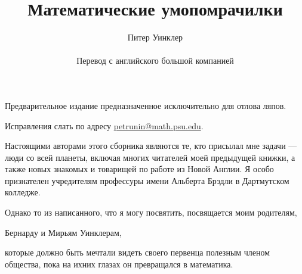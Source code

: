 \documentclass[twoside]{book}
\def\thetitle{Математические умопомрачилки} %
\def\theauthor{Питер Уинклер}
\begin{document}

\title{\thetitle}
\author{\theauthor\\
\\
Перевод с английского большой компанией}
\date{}
\maketitle

\thispagestyle{empty}

Предварительное издание предназначенное исключительно для отлова ляпов. 

Исправления слать по адресу 
\url{petrunin@math.psu.edu}.

\vfill

\pagebreak

Настоящими авторами этого сборника являются те, кто присылал мне задачи --- люди со всей планеты, включая многих читателей моей предыдущей книжки, а также новых знакомых и товарищей по работе из Новой Англии.
Я особо признателен учредителям профессуры имени Альберта Брэдли в Дартмутском колледже.

Однако то из написанного, что я могу посвятить, посвящается моим родителям,
\begin{center}
Бернарду и Мирьям Уинклерам,
\end{center}
которые должно быть мечтали видеть своего первенца полезным членом общества, пока на ихних глазах он превращался в математика.

\thispagestyle{empty}






















\appendix


{
\small

\printindex

}

{

\sloppy

\printbibliography[heading=bibintoc]


\fussy

}


\newpage

{

\tableofcontents

}
\end{document}
